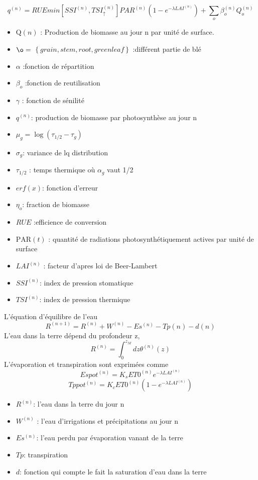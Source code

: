 \[ {q^{(n)}}=RUE min[SSI^{(n)}, TSI_\uparrow^{(n)}]PAR^{(n)}(1-e^{-\lambda LAI^{(n)}})+\sum_o \beta_o^{(n)}Q_o^{(n)} \]
\begin{itemize}
\item $\mathrm{Q}(n)$ : Production de biomasse au jour n par unité de surface.
\item $\o=$ $\left\lbrace grain, stem,root,greenleaf\right\rbrace$ :différent partie de blé
\item $\alpha$  :fonction de répartition
\item $\beta_o$  :fonction de reutilisation
\item $\gamma$ : fonction de sénilité
\item $q^{(n)}$: production de biomasse par photosynthèse au jour n 
\item $\mu_g=\log (\tau_{1/2}-\tau_g)$
\item $\sigma_g$: variance de lq distribution
\item $\tau_{1/2}$ : temps thermique où $\alpha_g$ vaut 1/2
\item $erf(x)$: fonction d'erreur
\item $\eta_o$: fraction de biomasse 
\item $RUE$ :efficience de conversion
\item $\mathrm{PAR}(t)$ : quantité de radiations photosynthétiquement actives par unité de surface
\item $LAI^{(n)}$ : facteur d'apres loi de Beer-Lambert 
\item $SSI^{(n)}$: index de pression stomatique 
\item $TSI^{(n)}$: index de pression thermique
\end{itemize}
L'équation d'équilibre de l'eau
\[ {R^{(n+1)}}=R^{(n)}+W^{(n)}-Es^{(n)}-Tp{(n)}-d{(n)}\]
L'eau dans la terre dépend du profondeur z,
\[ {R^{(n)}}=\int_0^{z_M}dz \theta^{(n)}(z) \]
L'évaporation et transpiration sont exprimées comme
\[ {Espot^{(n)}}=K_sET0^{(n)}e^{-\lambda LAI^{(n)}}\]
\[ {Tppot^{(n)}}=K_cET0^{(n)}(1-e^{-\lambda LAI^{(n)}})\]
\begin{itemize}
\item $R^{(n)}$: l'eau dans la terre du jour n
\item $W^{(n)}$ : l'eau d'irrigations et  précipitations au jour n
\item $Es^{(n)}$: l'eau perdu par évaporation vanant de la terre
\item $Tp$: transpiration
\item $d$: fonction qui compte le fait la saturation d'eau dans la terre
\end{itemize}
